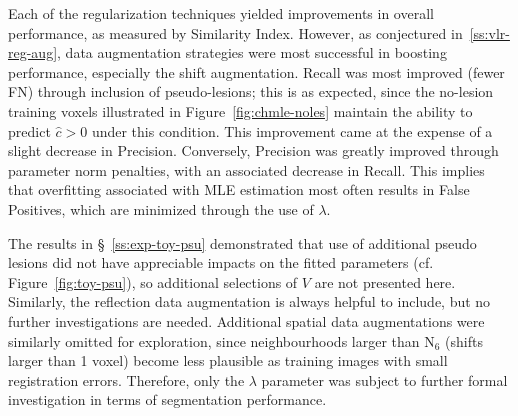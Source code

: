 Each of the regularization techniques yielded
improvements in overall performance, as measured by Similarity Index.
However, as conjectured in~\ref{ss:vlr-reg-aug},
data augmentation strategies were most successful in boosting performance,
especially the shift augmentation.
Recall was most improved (fewer FN) through inclusion of pseudo-lesions; this is as expected,
since the no-lesion training voxels illustrated in Figure~\ref{fig:chmle-noles}
maintain the ability to predict $\hat{c} > 0$ under this condition.
This improvement came at the expense of a slight decrease in Precision.
Conversely, Precision was greatly improved through parameter norm penalties,
with an associated decrease in Recall.
This implies that overfitting associated with MLE estimation
most often results in False Positives,
which are minimized through the use of $\lambda$.
\par
The results in \S~\ref{ss:exp-toy-psu} demonstrated that use of additional
pseudo lesions did not have appreciable impacts on the fitted parameters
(cf. Figure~\ref{fig:toy-psu}), so additional selections of $V$ are not presented here.
Similarly, the reflection data augmentation is always helpful to include,
but no further investigations are needed.
Additional spatial data augmentations were similarly omitted for exploration,
since neighbourhoods larger than $\mathrm{N}_6$ (shifts larger than 1 voxel)
become less plausible as training images with small registration errors.
Therefore, only the $\lambda$ parameter was subject to further formal investigation
in terms of segmentation performance.
